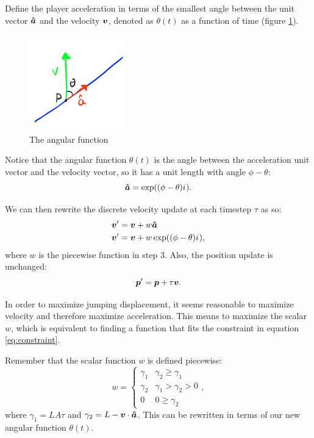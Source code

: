Define the player acceleration in terms of the smallest angle between the unit vector $\boldsymbol{\hat{a}}$ and the velocity $\boldsymbol{v}$, denoted as $\theta(t)$ as a function of time (figure \ref{fig:angular}).

\begin{figure}
    \includegraphics[width=0.37\textwidth,right]{assets/angular.png}
    \caption{The angular function}
    \label{fig:angular}
\end{figure}

Notice that the angular function $\theta(t)$ is the angle between the acceleration unit vector and the velocity vector, so it has a unit length with angle $\phi - \theta$:
\[
    \boldsymbol{\hat{a}} = \exp((\phi - \theta) {i\mkern1mu}).
\]

We can then rewrite the discrete velocity update at each timestep $\tau$ as so:
\begin{align*}
    \boldsymbol{v}' &= \boldsymbol{v} + w \boldsymbol{\hat{a}}\\
    \boldsymbol{v}' &= \boldsymbol{v} + w \exp((\phi - \theta) {i\mkern1mu}),
\end{align*}
where $w$ is the piecewise function in step 3. Also, the position update is unchanged:
\[
    \boldsymbol{p}' = \boldsymbol{p} + \tau \boldsymbol{v}.
\]

In order to maximize jumping displacement, it seems reasonable to maximize velocity and therefore maximize acceleration. This means to maximize the scalar $w$, which is equivalent to finding a function that fits the constraint in equation \ref{eq:constraint}.

Remember that the scalar function $w$ is defined piecewise:
\[
    w = \begin{cases}
        \gamma_1 & \gamma_2 \ge \gamma_1\\
     \gamma_2 & \gamma_1 > \gamma_2 > 0\\
     0 & 0 \ge \gamma_2
    \end{cases},
\]
where $\gamma_1 = LA\tau$ and $\gamma_2 = L - \boldsymbol{v} \cdot \boldsymbol{\hat{a}}$. This can be rewritten in terms of our new angular function $\theta(t)$.

